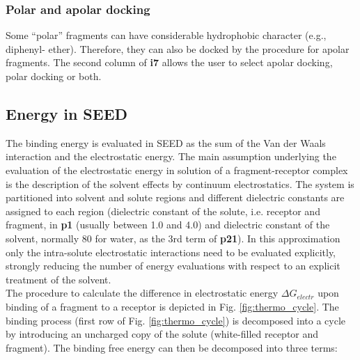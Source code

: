 \documentclass[a4paper,12pt,titlepage]{article}
\begin{document}
\subsubsection{Polar and apolar docking}

Some ``polar'' fragments can have considerable hydrophobic character (e.g., diphenyl-
ether). Therefore, 
they can also be docked by the procedure for apolar fragments. The second column of {\bf i7} allows 
the user to select apolar docking, polar docking or both.

\subsection{Energy in SEED}

The binding energy is evaluated in SEED as the sum of the Van der Waals interaction and 
the electrostatic energy.
The main assumption underlying the evaluation of the electrostatic 
energy in solution of a fragment-receptor complex is the description 
of the solvent effects by continuum electrostatics.
The system is partitioned into solvent and solute regions and 
different dielectric constants are assigned to each region 
(dielectric constant of the solute, i.e. receptor and fragment, in {\bf p1} (usually between 1.0 and 4.0) and 
dielectric constant of the solvent, normally 80 for water, as the 3rd term of {\bf p21}).
In this approximation only the intra-solute electrostatic interactions need to be evaluated explicitly, strongly reducing the number of energy evaluations with respect to an explicit treatment of the solvent. \\
The procedure to calculate the difference in electrostatic energy $\Delta G_{electr}$ upon binding of 
a fragment to a receptor is depicted in Fig. \ref{fig:thermo_cycle}. The binding process (first row of Fig. \ref{fig:thermo_cycle}) is decomposed into a cycle
by introducing an uncharged copy of the solute (white-filled receptor and fragment).
The binding free energy can then be decomposed into three terms:
\end{document}
